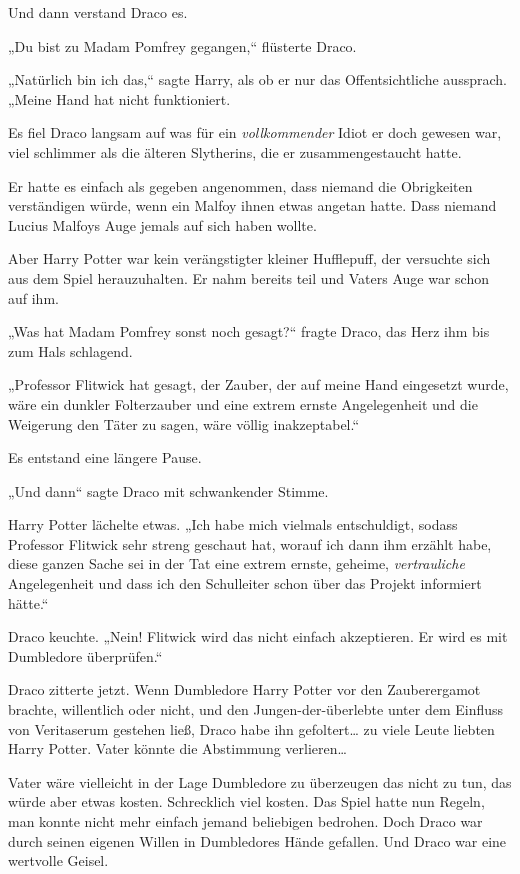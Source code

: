 {Und dann verstand Draco es.

„Du bist zu Madam Pomfrey gegangen,“ flüsterte Draco.

„Natürlich bin ich das,“ sagte Harry, als ob er nur das Offentsichtliche aussprach. „Meine Hand hat nicht funktioniert.

Es fiel Draco langsam auf was für ein \emph{vollkommender} Idiot er doch gewesen war, viel schlimmer als die älteren Slytherins, die er zusammengestaucht hatte.

Er hatte es einfach als gegeben angenommen, dass niemand die Obrigkeiten verständigen würde, wenn ein Malfoy ihnen etwas angetan hatte. Dass niemand Lucius Malfoys Auge jemals auf sich haben wollte.

Aber Harry Potter war kein verängstigter kleiner Hufflepuff, der versuchte sich aus dem Spiel herauzuhalten. Er nahm bereits teil und Vaters Auge war schon auf ihm.

„Was hat Madam Pomfrey sonst noch gesagt?“ fragte Draco, das Herz ihm bis zum Hals schlagend.

„Professor Flitwick hat gesagt, der Zauber, der auf meine Hand eingesetzt wurde, wäre ein dunkler Folterzauber und eine extrem ernste Angelegenheit und die Weigerung den Täter zu sagen, wäre völlig inakzeptabel.“

Es entstand eine längere Pause.

„Und dann“ sagte Draco mit schwankender Stimme.

Harry Potter lächelte etwas. „Ich habe mich vielmals entschuldigt, sodass Professor Flitwick sehr streng geschaut hat, worauf ich dann ihm erzählt habe, diese ganzen Sache sei in der Tat eine extrem ernste, geheime, \emph{vertrauliche} Angelegenheit und dass ich den Schulleiter schon über das Projekt informiert hätte.“

Draco keuchte. „Nein! Flitwick wird das nicht einfach akzeptieren. Er wird es mit Dumbledore überprüfen.“

Draco zitterte jetzt. Wenn Dumbledore Harry Potter vor den Zauberergamot brachte, willentlich oder nicht, und den Jungen-der-überlebte unter dem Einfluss von Veritaserum gestehen ließ, Draco habe ihn gefoltert… zu viele Leute liebten Harry Potter. Vater könnte die Abstimmung verlieren…

Vater wäre vielleicht in der Lage Dumbledore zu überzeugen das nicht zu tun, das würde aber etwas kosten. Schrecklich viel kosten. Das Spiel hatte nun Regeln, man konnte nicht mehr einfach jemand beliebigen bedrohen. Doch Draco war durch seinen eigenen Willen in Dumbledores Hände gefallen. Und Draco war eine wertvolle Geisel.

}
